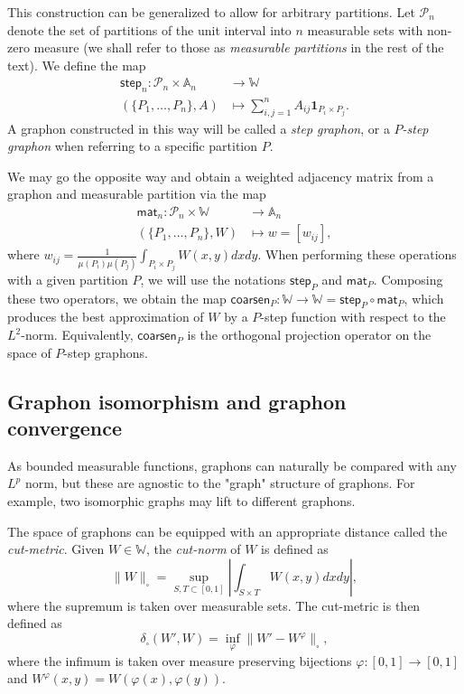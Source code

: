 \documentclass[11pt]{article}
\def\AA{\mathbb{A}}
\def\WW{\mathbb{W}}
\def\II{\bm{1}}
\def\calP{\mathcal{P}}
\newcommand{\sans}[1]{\mathsf{#1}}
\def\step{\sans{step}}
\def\mat{\sans{mat}}
\def\coarsen{\sans{coarsen}}
\theoremstyle{definition}
\begin{document}
This construction can be generalized to allow for arbitrary partitions. Let $\calP_n$ denote the set of partitions of the unit interval into $n$ measurable sets with non-zero measure (we shall refer to those as \textit{measurable partitions} in the rest of the text). We define the map
\begin{align*}
    \step_n : \calP_n \times \AA_n &\rightarrow \WW\\
    (\{P_1,\dots,P_n\},A) &\mapsto \sum_{i,j=1}^n A_{ij} \II_{P_i \times P_j}.
\end{align*}
A graphon constructed in this way will be called a \textit{step graphon}, or a \textit{$P$-step graphon} when referring to a specific partition $P$.

We may go the opposite way and obtain a weighted adjacency matrix from a graphon and measurable partition via the map
\begin{align*}
    \mat_n : \calP_n \times \WW &\rightarrow \AA_n\\
    (\{P_1,\dots,P_n\}, W) &\mapsto w = [w_{ij}],
\end{align*}
where $w_{ij} = \frac{1}{\mu(P_i) \mu(P_j)} \int_{P_i \times P_j} W(x,y) dx dy$. When performing these operations with a given partition $P$, we will use the notations $\step_P$ and $\mat_P$. Composing these two operators, we obtain the map $\coarsen_P : \WW \rightarrow \WW = \step_P \circ \mat_P$, which produces the best approximation of $W$ by a $P$-step function with respect to the $L^2$-norm. Equivalently, $\coarsen_P$ is the orthogonal projection operator on the space of $P$-step graphons.

\subsection{Graphon isomorphism and graphon convergence}

As bounded measurable functions, graphons can naturally be compared with any $L^p$ norm, but these are agnostic to the "graph" structure of graphons. For example, two isomorphic graphs may lift to different graphons.

The space of graphons can be equipped with an appropriate distance called the \textit{cut-metric}. Given $W \in \WW$, the \textit{cut-norm} of $W$ is defined as
$$ \|W\|_\square = \sup_{S,T \subset [0,1]} \left|\int_{S\times T} W(x,y) dx dy\right|, $$
where the supremum is taken over measurable sets. The cut-metric is then defined as
$$ \delta_\square (W',W) = \inf_{\varphi} \|W'- W^\varphi \|_\square,$$
where the infimum is taken over measure preserving bijections $\varphi :[0,1] \rightarrow [0,1]$ and $W^\varphi (x,y) = W(\varphi(x),\varphi(y))$. 
\end{document}
